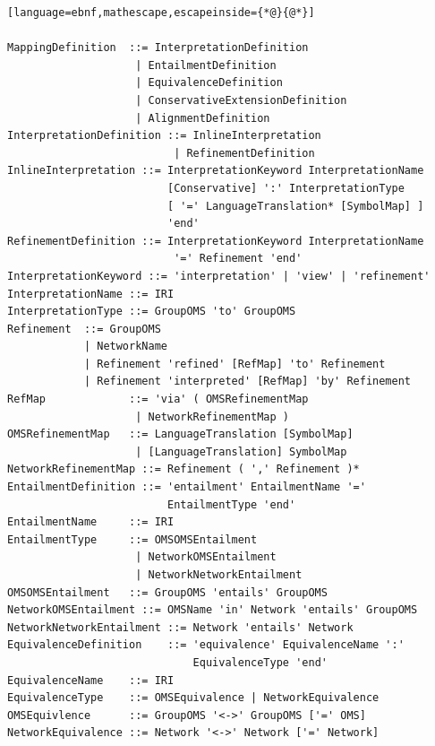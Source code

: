 \documentclass[10pt, a4paper]{isov2}
\begin{document}

\label{a:dol-text:mappings}

\vspace{-2em}
\begin{lstlisting}[language=ebnf,mathescape,escapeinside={*@}{@*}]

MappingDefinition  ::= InterpretationDefinition
                    | EntailmentDefinition
                    | EquivalenceDefinition
                    | ConservativeExtensionDefinition
                    | AlignmentDefinition
InterpretationDefinition ::= InlineInterpretation 
                          | RefinementDefinition
InlineInterpretation ::= InterpretationKeyword InterpretationName
                         [Conservative] ':' InterpretationType
                         [ '=' LanguageTranslation* [SymbolMap] ]
                         'end'
RefinementDefinition ::= InterpretationKeyword InterpretationName
                          '=' Refinement 'end'
InterpretationKeyword ::= 'interpretation' | 'view' | 'refinement'
InterpretationName ::= IRI
InterpretationType ::= GroupOMS 'to' GroupOMS
Refinement  ::= GroupOMS
            | NetworkName
            | Refinement 'refined' [RefMap] 'to' Refinement
            | Refinement 'interpreted' [RefMap] 'by' Refinement
RefMap             ::= 'via' ( OMSRefinementMap 
                    | NetworkRefinementMap )
OMSRefinementMap   ::= LanguageTranslation [SymbolMap]
                    | [LanguageTranslation] SymbolMap
NetworkRefinementMap ::= Refinement ( ',' Refinement )*
EntailmentDefinition ::= 'entailment' EntailmentName '='
                         EntailmentType 'end'
EntailmentName     ::= IRI
EntailmentType     ::= OMSOMSEntailment
                    | NetworkOMSEntailment
                    | NetworkNetworkEntailment
OMSOMSEntailment   ::= GroupOMS 'entails' GroupOMS
NetworkOMSEntailment ::= OMSName 'in' Network 'entails' GroupOMS
NetworkNetworkEntailment ::= Network 'entails' Network
EquivalenceDefinition    ::= 'equivalence' EquivalenceName ':'
                             EquivalenceType 'end'
EquivalenceName    ::= IRI
EquivalenceType    ::= OMSEquivalence | NetworkEquivalence
OMSEquivlence      ::= GroupOMS '<->' GroupOMS ['=' OMS]
NetworkEquivalence ::= Network '<->' Network ['=' Network]

\end{lstlisting}
\end{document}
